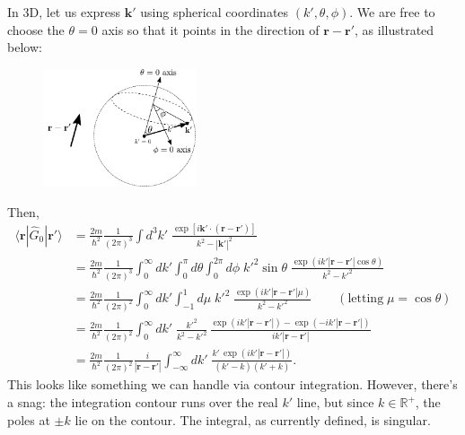 \documentclass[pra,12pt]{revtex4-2}
\begin{document}
In 3D, let us express $\mathbf{k}'$ using spherical coordinates
$(k',\theta,\phi)$.  We are free to choose the $\theta=0$ axis so that
it points in the direction of $\mathbf{r}-\mathbf{r}'$, as illustrated
below:

\begin{figure}[h]
  \centering\includegraphics[width=0.4\textwidth]{spherical_coords}
\end{figure}

Then,
\begin{align}
  \langle\mathbf{r}|\hat{G}_0|\mathbf{r}'\rangle &= \frac{2m}{\hbar^2} \frac{1}{(2\pi)^3} \int d^3k' \; \frac{\exp\left[i\mathbf{k}'\cdot (\mathbf{r}-\mathbf{r}')\right]}{k^2-|\mathbf{k}'|^2} \nonumber \\
  &= \frac{2m}{\hbar^2} \frac{1}{(2\pi)^3} \int_0^\infty dk' \int_0^\pi d\theta \int_{0}^{2\pi} d\phi \;{k'}^{2}\sin\theta\; \frac{\displaystyle \exp\left(ik'|\mathbf{r}-\mathbf{r}'|\cos\theta\right)}{k^2-{k'}^2} \nonumber \\
  &= \frac{2m}{\hbar^2} \frac{1}{(2\pi)^2} \int_0^\infty dk' \int_{-1}^1 d\mu \;{k'}^2\; \frac{\displaystyle \exp\left(ik'|\mathbf{r}-\mathbf{r}'|\mu\right)}{k^2-{k'}^2} \qquad(\text{letting}\;\mu = \cos\theta) \nonumber \\
  &= \frac{2m}{\hbar^2} \frac{1}{(2\pi)^2} \int_0^\infty dk' \; \frac{ {k'}^2}{k^2-{k'}^2}\, \frac{\displaystyle \exp\left(ik'|\mathbf{r}-\mathbf{r}'|\right) - \exp\left(-ik'|\mathbf{r}-\mathbf{r}'|\right)}{ik'|\mathbf{r}-\mathbf{r}'|} \nonumber\\
  &= \frac{2m}{\hbar^2} \frac{1}{(2\pi)^2} \frac{i}{|\mathbf{r}-\mathbf{r}'|} \int_{-\infty}^\infty dk' \; \frac{\displaystyle k'\, \exp\left(ik'|\mathbf{r}-\mathbf{r}'|\right)}{(k' - k)(k'+k)}.
  \label{rGrintegrand}
\end{align}
This looks like something we can handle via contour integration.
However, there's a snag: the integration contour runs over the real
$k'$ line, but since $k \in \mathbb{R}^+$, the poles at $\pm k$ lie on
the contour.  The integral, as currently defined, is singular.
\end{document}
